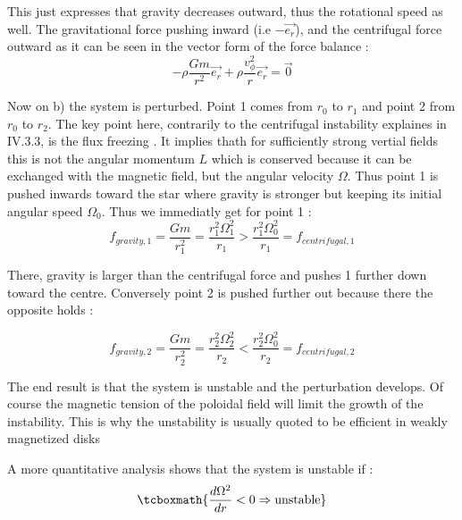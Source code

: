 \documentclass[10pt,a4paper,english,draft]{article}
\begin{document}
This just expresses that gravity decreases outward, thus the rotational speed as well. The gravitational 
force pushing inward (i.e $-\vec{e_r}$), and the centrifugal force  outward as it can be seen in the vector
form of the force balance :
\begin{equation}
-\rho\frac{Gm}{r^2}\vec{e_r} + \rho\frac{v_{\phi}^2}{r}\vec{e_r} = \vec{0}
\end{equation}

Now  on b) the system is perturbed. Point 1 comes from $r_0$ to $r_1$ and point 2 from 
$r_0$ to $r_2$. The key point here, contrarily to the centrifugal instability explaines in 
IV.3.3, is the flux freezing . It implies thath for sufficiently strong vertial fields this is not 
the angular momentum $ L$ which is conserved because it can be exchanged with the magnetic field,
but the angular velocity $\Omega$. Thus point 1 is pushed inwards toward the star where 
gravity is stronger but keeping its initial angular speed $\Omega_0$. Thus we immediatly get 
for point 1 : 
\begin{equation}
f_{gravity,1} = \frac{Gm}{r_1^2} = \frac{r_1^2\Omega_1^2	}{r_1} > 
\frac{r_1^2\Omega_0^2}{r_1} = f_{centrifugal,1}
\end{equation}

There, gravity is larger than the centrifugal force and pushes 1 further  down toward the centre. 
Conversely point 2 is pushed further out because there the opposite holds : 

\begin{equation}
f_{gravity,2} = \frac{Gm}{r_2^2} = \frac{r_2^2\Omega_2^2	}{r_2} < 
\frac{r_2^2\Omega_0^2}{r_2} = f_{centrifugal,2}
\end{equation}


The end result is that the system is unstable and the perturbation develops. Of course the magnetic
tension of the poloidal field will limit the growth of the instability. This is why the unstability is usually
quoted to be efficient in weakly magnetized disks

A more quantitative analysis shows that the system  is unstable if : 
\begin{equation}
\tcboxmath{\frac{d\Omega^2}{dr} < 0 \Rightarrow \text{unstable}}
\end{equation}
\end{document}
